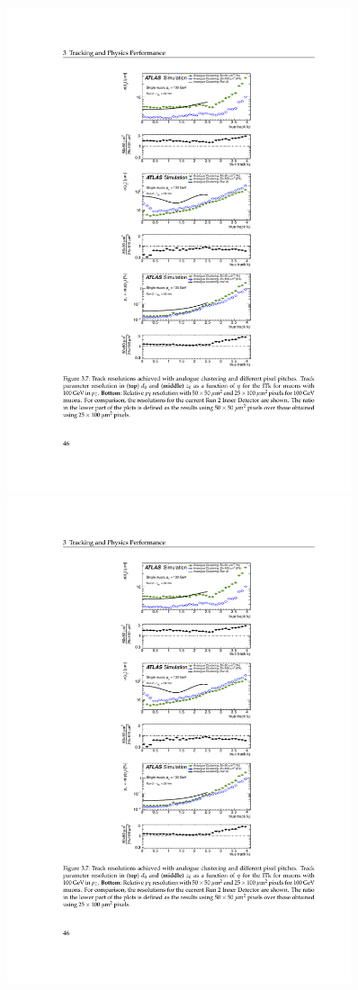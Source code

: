 \begin{figure}[t]
\begin{center}
  \includegraphics[width=0.9\textwidth]{figures/atlas-tdr-030-fig3-7a.pdf}\\
  \includegraphics[width=0.9\textwidth]{figures/atlas-tdr-030-fig3-7b.pdf}

\end{center}
\end{figure}
